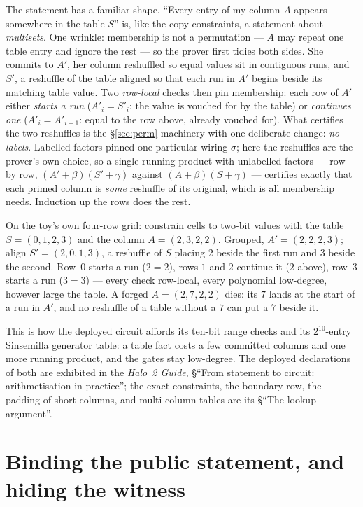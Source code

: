 \documentclass[11pt,a4paper]{article}
\theoremstyle{definition}
\begin{document}
The statement has a familiar shape. ``Every entry of my column $A$
appears somewhere in the table $S$'' is, like the copy constraints, a
statement about \emph{multisets}. One wrinkle: membership is not a
permutation --- $A$ may repeat one table entry and ignore the rest ---
so the prover first tidies both sides. She commits to $A'$, her column
reshuffled so equal values sit in contiguous runs, and $S'$, a
reshuffle of the table aligned so that each run in $A'$ begins beside
its matching table value. Two \emph{row-local} checks then pin
membership: each row of $A'$ either \emph{starts a run}
($A'_i = S'_i$: the value is vouched for by the table) or
\emph{continues one} ($A'_i = A'_{i-1}$: equal to the row above,
already vouched for). What certifies the two reshuffles is the
\S\ref{sec:perm} machinery with one deliberate change: \emph{no
labels}. Labelled factors pinned one particular wiring $\sigma$; here
the reshuffles are the prover's own choice, so a single running product
with unlabelled factors --- row by row, $(A' + \beta)(S' + \gamma)$
against $(A + \beta)(S + \gamma)$ --- certifies exactly that each
primed column is \emph{some} reshuffle of its original, which is all
membership needs. Induction up the rows does the rest.

On the toy's own four-row grid: constrain cells to two-bit values with
the table $S = (0, 1, 2, 3)$ and the column $A = (2, 3, 2, 2)$.
Grouped, $A' = (2, 2, 2, 3)$; align $S' = (2, 0, 1, 3)$, a reshuffle of
$S$ placing $2$ beside the first run and $3$ beside the second. Row~$0$
starts a run ($2 = 2$), rows $1$ and $2$ continue it ($2$ above),
row~$3$ starts a run ($3 = 3$) --- every check row-local, every
polynomial low-degree, however large the table. A forged
$A = (2, 7, 2, 2)$ dies: its $7$ lands at the start of a run in $A'$,
and no reshuffle of a table without a $7$ can put a $7$ beside it.

This is how the deployed circuit affords its ten-bit range checks and
its $2^{10}$-entry Sinsemilla generator table: a table fact costs a few
committed columns and one more running product, and the gates stay
low-degree. The deployed declarations of both are exhibited in the
\emph{Halo~2 Guide}, \S``From statement to circuit: arithmetisation in
practice''; the exact constraints, the boundary row, the padding of
short columns, and multi-column tables are its \S``The lookup
argument''.

\section{Binding the public statement, and hiding the witness}\label{sec:zk}
\end{document}
